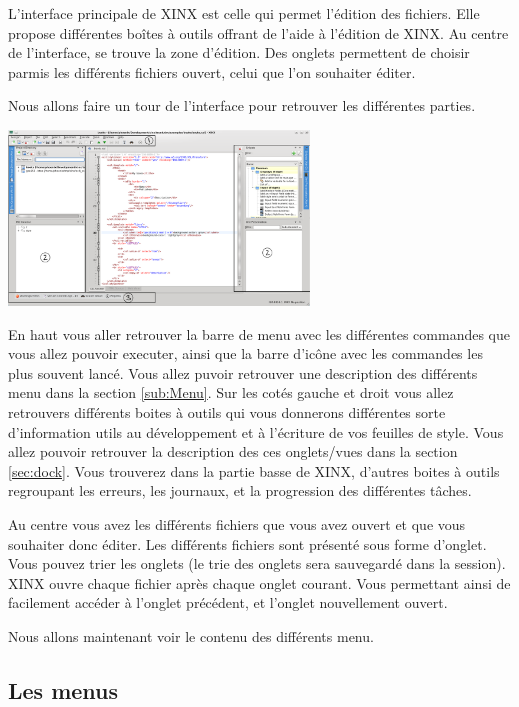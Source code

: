 \documentclass[a4paper,10pt,twoside]{book}
\begin{document}
L'interface principale de XINX est celle qui permet l'édition des fichiers. Elle propose différentes boîtes à outils offrant de l'aide à l'édition de XINX. Au centre de l'interface, se trouve la zone d'édition. Des onglets permettent de choisir parmis les différents fichiers ouvert, celui que l'on souhaiter éditer.

Nous allons faire un tour de l'interface pour retrouver les différentes parties.

\begin{center}
 \includegraphics[width=0.60\textwidth]{./xinxmainform.png}
\end{center}

En haut vous aller retrouver la barre de menu avec les différentes commandes que vous allez pouvoir executer, ainsi que la barre d'icône avec les commandes les plus souvent lancé. Vous allez puvoir retrouver une description des différents menu dans la section \ref{sub:Menu}. Sur les cotés gauche et droit vous allez retrouvers différents boites à outils qui vous donnerons différentes sorte d'information utils au développement et à l'écriture de vos feuilles de style. Vous allez pouvoir retrouver la description des ces onglets/vues dans la section \ref{sec:dock}. Vous trouverez dans la partie basse de XINX, d'autres boites à outils regroupant les erreurs, les journaux, et la progression des différentes tâches.

Au centre vous avez les différents fichiers que vous avez ouvert et que vous souhaiter donc éditer. Les différents fichiers sont présenté sous forme d'onglet. Vous pouvez trier les onglets (le trie des onglets sera sauvegardé dans la session). XINX ouvre chaque fichier après chaque onglet courant. Vous permettant ainsi de facilement accéder à l'onglet précédent, et l'onglet nouvellement ouvert.

Nous allons maintenant voir le contenu des différents menu.

\subsection{Les menus}
\label{sub:menu}
\end{document}
